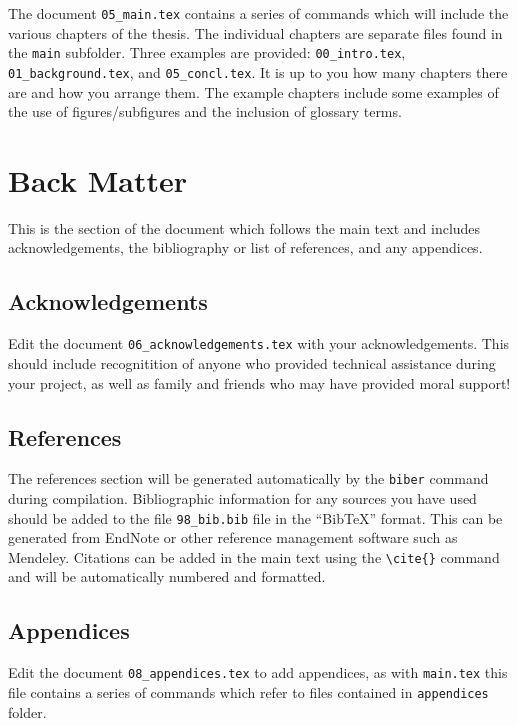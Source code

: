 \documentclass[a4paper,12pt]{article}
\begin{document}
The document \verb+05_main.tex+ contains a series of \verb++ commands
which will include the various chapters of the thesis.  The individual chapters
are separate files found in the \verb+main+ subfolder.  Three examples are
provided: \verb+00_intro.tex+,  \verb+01_background.tex+, and
\verb+05_concl.tex+.  It is up to you how many chapters there are and how you
arrange them.  The example chapters include some examples of the use of
figures/subfigures and the inclusion of glossary terms.

\section{Back Matter}

This is the section of the document which follows the main text and includes
acknowledgements, the bibliography or list of references, and any appendices.

\subsection{Acknowledgements}

Edit the document \verb+06_acknowledgements.tex+ with your acknowledgements.
This should include recognitition of anyone who provided technical assistance
during your project, as well as family and friends who may have provided moral
support!

\subsection{References}

The references section will be generated automatically by the \verb+biber+
command during compilation.  Bibliographic information for any sources you have
used should be added to the file \verb+98_bib.bib+ file in the ``BibTeX''
format.  This can be generated from EndNote or other reference management
software such as Mendeley.  Citations can be added in the main text using the
\verb+\cite{}+ command and will be automatically numbered and formatted.

\subsection{Appendices}

Edit the document \verb+08_appendices.tex+ to add appendices, as with
\verb+main.tex+ this file contains a series of \verb++ commands which
refer to files contained in \verb+appendices+ folder. 
\end{document}
